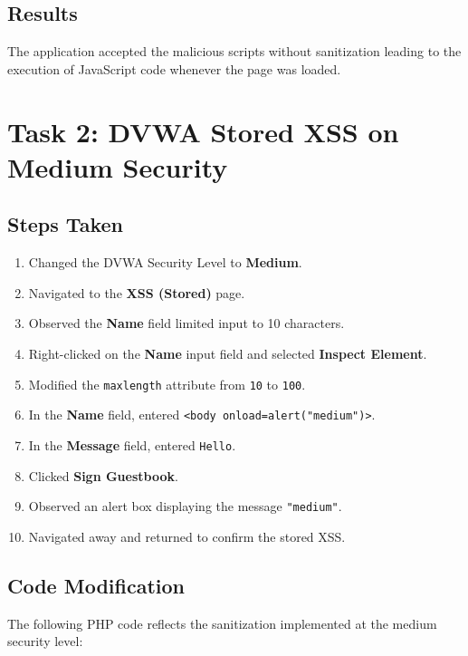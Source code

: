 \documentclass[12pt]{article}
\begin{document}
\subsection{Results}

The application accepted the malicious scripts without sanitization leading to the execution of JavaScript code whenever the page was loaded. 

\section{Task 2: DVWA Stored XSS on Medium Security}

\subsection{Steps Taken}

\begin{enumerate}
    \item Changed the DVWA Security Level to \textbf{Medium}.
    \item Navigated to the \textbf{XSS (Stored)} page.
    \item Observed the \textbf{Name} field limited input to 10 characters.
    \item Right-clicked on the \textbf{Name} input field and selected \textbf{Inspect Element}.
    \item Modified the \texttt{maxlength} attribute from \texttt{10} to \texttt{100}.
    \item In the \textbf{Name} field, entered \texttt{<body onload=alert("medium")>}.
    \item In the \textbf{Message} field, entered \texttt{Hello}.
    \item Clicked \textbf{Sign Guestbook}.
    \item Observed an alert box displaying the message \texttt{"medium"}.
    \item Navigated away and returned to confirm the stored XSS.
\end{enumerate}

\subsection{Code Modification}

The following PHP code reflects the sanitization implemented at the medium security level:
\end{document}
